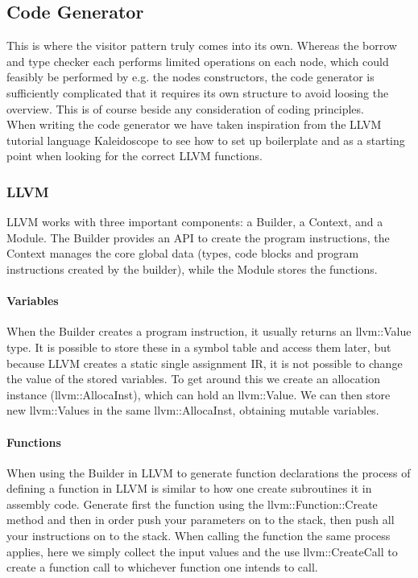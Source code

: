 \subsection{Code Generator}
\label{sec:CodeGenImplement}
This is where the visitor pattern truly comes into its own. Whereas the borrow and type checker each performs limited operations on each node, which could feasibly be performed by e.g. the nodes constructors, the code generator is sufficiently complicated that it requires its own structure to avoid loosing the overview. This is of course beside any consideration of coding principles.\\
When writing the code generator we have taken inspiration from the LLVM tutorial
language Kaleidoscope\cite{LLVMTutorial} to see how to set up boilerplate and as a
starting point when looking for the correct LLVM functions.

\subsubsection{LLVM}
LLVM works with three important components: a Builder, a Context, and a Module. The Builder provides an API to create the program instructions, the Context manages the core global data (types, code blocks and program instructions created by the builder), while the Module stores the functions.

\paragraph*{Variables}
When the Builder creates a program instruction, it usually returns an llvm::Value type. It is possible to store these in a symbol table and access them later, but because LLVM creates a static single assignment IR, it is not possible to change the value of the stored variables. To get around this we create an allocation instance (llvm::AllocaInst), which can hold an llvm::Value. We can then store new llvm::Values in the same llvm::AllocaInst, obtaining mutable variables.


\paragraph*{Functions}

When using the Builder in LLVM to generate function declarations the process of
defining a function in LLVM is similar to how one create subroutines it in assembly
code. Generate first the function using the llvm::Function::Create method and then in
order push your parameters on to the stack, then push all your instructions on to the
stack. When calling the function the same process applies, here we simply collect the
input values and the use llvm::CreateCall to create a function call to whichever
function one intends to call. \\


